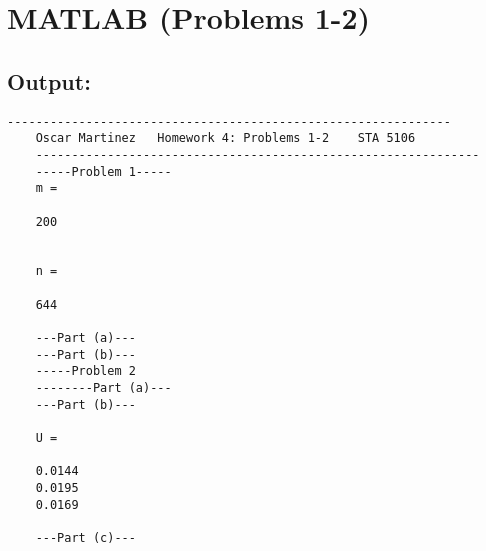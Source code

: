 \documentclass[12pt]{article}
\begin{document}
	
	\section*{MATLAB (Problems 1-2)}
	\subsection*{Output:}
	\begin{Verbatim}[fontsize=\small]
	--------------------------------------------------------------
	Oscar Martinez 	 Homework 4: Problems 1-2 	 STA 5106
	--------------------------------------------------------------
	-----Problem 1-----
	m =
	
	200
	
	
	n =
	
	644
	
	---Part (a)---
	---Part (b)---
	-----Problem 2
	--------Part (a)---
	---Part (b)---
	
	U =
	
	0.0144
	0.0195
	0.0169
	
	---Part (c)---
	\end{Verbatim}
	
\end{document}
